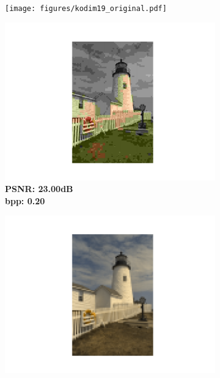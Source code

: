 \begin{figure}[t]
	\centering
	\begin{subfigure}{.19\textwidth}
		\centering
		\texttt{[image: figures/kodim19\_original.pdf]}
        \vspace{-6pt}
        \caption*{\tiny}
	\end{subfigure}%
	\begin{subfigure}{.19\textwidth}
		\centering
		\includegraphics[trim=5cm 1.5cm 5cm 1.7cm, clip, width=1\textwidth]{figures/kodim19_JPEG_bpp_0.202.pdf}
        \vspace{-15pt}
        \caption*{\tiny \textbf{PSNR: 23.00dB \\ bpp: 0.20}}
	\end{subfigure}
    \begin{subfigure}{.19\textwidth}
		\centering
		\includegraphics[trim=5cm 1.5cm 5cm 1.7cm, clip, width=1\textwidth]{figures/kodim19_SVD_bpp_0.215.pdf}

\end{subfigure}
\end{figure}
